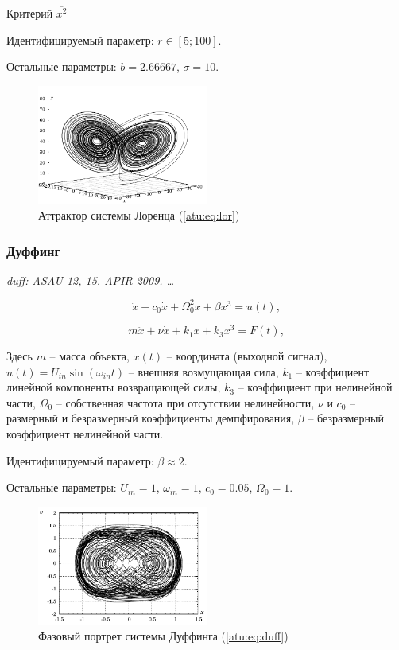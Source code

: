 \documentclass[a4paper,12pt]{article}
\newcommand{\LinkRef}[1]{ \textit{#1} }
\begin{document}
Критерий
$\overline{x^2}$


Идентифицируемый параметр:
$r \in [ 5; 100 ] $.

Остальные параметры:
$b = 2.66667$, $\sigma = 10$.


\begin{figure}[htb!]
\centerline{\includegraphics[width=0.5\textwidth]{p/cha/lor_phase3.pdf} }
\caption{Аттрактор системы Лоренца (\ref{atu:eq:lor})}
\label{atu:f:lor_phase}
\end{figure}


\FloatBarrier
\subsubsection{Дуффинг} %

\LinkRef{
 duff: ASAU-12, 15. APIR-2009. \ldots
}

\begin{equation}
 \ddot{x} + c_0 \dot{x} + \Omega_0^2 x + \beta x^3 = u(t) ,
\label{atu:eq:duff}
\end{equation}

\begin{equation}
 m \ddot{x} + \nu \dot{x} + k_1 x + k_3 x^3 = F(t) ,
\label{atu:eq:duff_phys}
\end{equation}

Здесь \(m\) -- масса объекта,
\(x(t)\) -- координата (выходной сигнал),
\(u(t) = U_{in} \sin( \omega_{in} t ) \) -- внешняя возмущающая сила,
\( k_1 \) -- коэффициент линейной компоненты возвращающей силы,
\( k_3 \) -- коэффициент при нелинейной части,
\( \Omega_0 \) -- собственная частота при отсутствии нелинейности,
\( \nu \) и \( c_0\) -- размерный и безразмерный коэффициенты демпфирования,
\( \beta \) -- безразмерный коэффициент нелинейной части.

Идентифицируемый параметр:
$ \beta \approx 2 $.

Остальные параметры:
\(U_{in}=1\), \(\omega_{in}=1\),
\(c_0 = 0.05\), \( \Omega_0 = 1 \).

\begin{figure}[htb!]
\centerline{\includegraphics[width=0.5\textwidth]{p/cha/duff_phase.pdf} }
\caption{Фазовый портрет системы Дуффинга (\ref{atu:eq:duff})}
\label{atu:f:duff_phase}
\end{figure}
\end{document}

